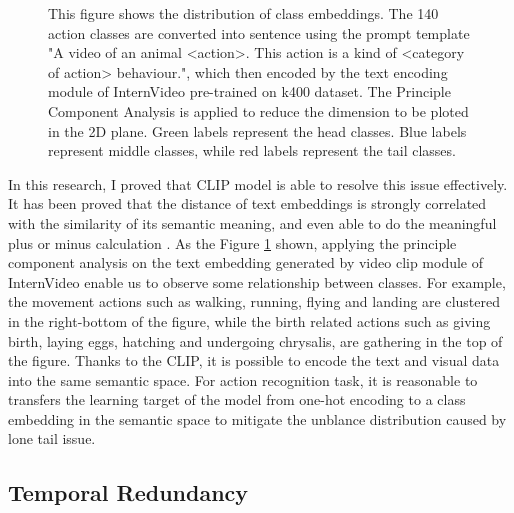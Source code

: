 \begin{figure}[h]
    \centering
    \caption[Class Embedding Distribution]{This figure shows the distribution of class embeddings. The 140 action classes are converted into sentence using the prompt template "A video of an animal <action>. This action is a kind of <category of action> behaviour.", which then encoded by the text encoding module of InternVideo \parencite{wang2022internvideo} pre-trained on k400 dataset. The Principle Component Analysis is applied to reduce the dimension to be ploted in the 2D plane. Green labels represent the head classes. Blue labels represent middle classes, while red labels represent the tail classes.}
    \label{fig:1_1_ClassEmbeddingInternVideo}
\end{figure}



In this research, I proved that CLIP model is able to resolve this issue effectively. It has been proved that the distance of text embeddings is strongly correlated with the similarity of its semantic meaning, and even able to do the meaningful plus or minus calculation \parencite{mikolov2013efficient}. As the Figure \ref{fig:1_1_ClassEmbeddingInternVideo} shown, applying the principle component analysis on the text embedding generated by video clip module of InternVideo \parencite{wang2022internvideo} enable us to observe some relationship between classes. For example, the movement actions such as walking, running, flying and landing are clustered in the right-bottom of the figure, while the birth related actions such as giving birth, laying eggs, hatching and undergoing chrysalis, are gathering in the top of the figure. Thanks to the CLIP, it is possible to encode the text and visual data into the same semantic space. For action recognition task, it is reasonable to transfers the learning target of the model from one-hot encoding to a class embedding in the semantic space \parencite{ma2022x} to mitigate the unblance distribution caused by lone tail issue. 

\subsection{Temporal Redundancy}

